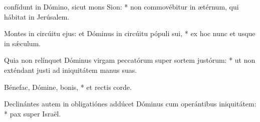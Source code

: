 \begin{psalmus}

 confídunt in Dómino, sicut mons Sion: * non commovébitur in ætérnum, qui hábitat in Jerúsalem.

Montes in circúitu ejus: et Dóminus in circúitu pópuli sui, * ex hoc nunc et usque in sǽculum.

Quia non relínquet Dóminus virgam peccatórum super sortem justórum: * ut non exténdant justi ad iniquitátem manus suas.

Bénefac, Dómine, bonis, * et rectis corde.

Declinántes autem in obligatiónes addúcet Dóminus cum operántibus iniquitátem: * pax super Israël.

\end{psalmus}
